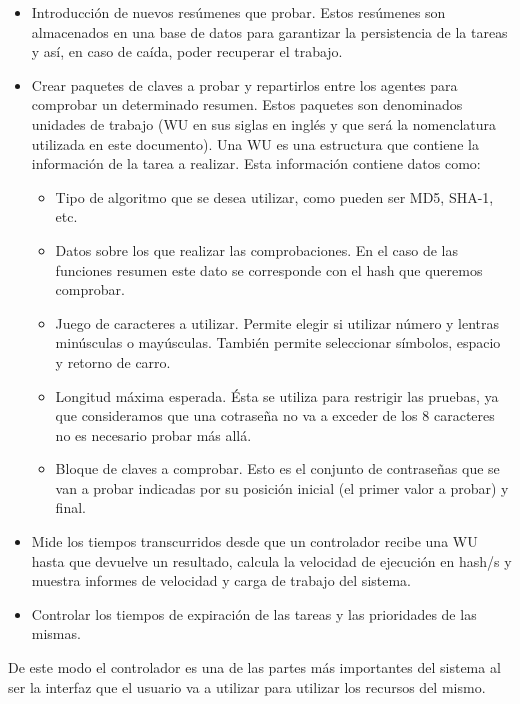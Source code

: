 \begin{itemize}
	\item Introducción de nuevos resúmenes que probar. Estos resúmenes son almacenados en una base de datos para garantizar la persistencia de la tareas y así, en caso de caída, poder recuperar el trabajo.

	\item Crear paquetes de claves a probar y repartirlos entre los agentes para comprobar un determinado resumen. Estos paquetes son denominados unidades de trabajo (WU en sus siglas en inglés y que será la nomenclatura utilizada en este documento). Una WU es una estructura que contiene la información de la tarea a realizar. Esta información contiene datos como:

	\begin{itemize}
		\item Tipo de algoritmo que se desea utilizar, como pueden ser MD5, SHA-1, etc.
	
		\item Datos sobre los que realizar las comprobaciones. En el caso de las funciones resumen este dato se corresponde con el hash que queremos comprobar.
	
		\item Juego de caracteres a utilizar. Permite elegir si utilizar número y lentras minúsculas o mayúsculas. También permite seleccionar símbolos, espacio y retorno de carro.
	
		\item Longitud máxima esperada. Ésta se utiliza para restrigir las pruebas, ya que consideramos que una cotraseña no va a exceder de los 8 caracteres no es necesario probar más allá.
	
		\item Bloque de claves a comprobar. Esto es el conjunto de contraseñas que se van a probar indicadas por su posición inicial (el primer valor a probar) y final.
	\end{itemize}
	
	\item Mide los tiempos transcurridos desde que un controlador recibe una WU hasta que devuelve un resultado, calcula la velocidad de ejecución en hash/s y muestra informes de velocidad y carga de trabajo del sistema.
	
	\item Controlar los tiempos de expiración de las tareas y las prioridades de las mismas.
\end{itemize}

De este modo el controlador es una de las partes más importantes del sistema al ser la interfaz que el usuario va a utilizar para utilizar los recursos del mismo.

